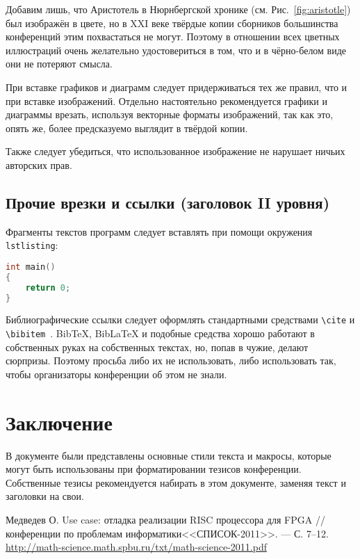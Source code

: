 \documentclass{math-mech-sci}
\begin{document}
Добавим лишь, что Аристотель в Нюрнбергской хронике
(см. Рис.~\ref{fig:aristotle}) был изображён в цвете, но в XXI веке
твёрдые копии сборников большинства конференций этим похвастаться не
могут. Поэтому в отношении всех цветных иллюстраций очень желательно
удостовериться в том, что и в чёрно-белом виде они не потеряют смысла.

При вставке графиков и диаграмм следует придерживаться тех же правил,
что и при вставке изображений. Отдельно настоятельно рекомендуется
графики и диаграммы врезать, используя векторные форматы изображений,
так как это, опять же, более предсказуемо выглядит в твёрдой копии.

Также следует убедиться, что использованное изображение не нарушает
ничьих авторских прав.

\subsection*{Прочие врезки и ссылки (заголовок II уровня)}

Фрагменты текстов программ следует вставлять при помощи окружения
\texttt{lstlisting}:

\begin{lstlisting}[language=C,label=lst:code1]
int main()
{
    return 0;
}
\end{lstlisting}

Библиографические ссылки следует оформлять стандартными средствами
\texttt{\textbackslash{}cite} и
\texttt{\textbackslash{}bibitem}~\cite{medvedev2011}. BibTeX, BibLaTeX
и подобные средства хорошо работают в собственных руках на собственных
текстах, но, попав в чужие, делают сюрпризы.  Поэтому просьба либо их
не использовать, либо использовать так, чтобы организаторы конференции
об этом не знали.

\section*{Заключение}

В документе были представлены основные стили текста и макросы, которые
могут быть использованы при форматировании тезисов конференции.
Собственные тезисы рекомендуется набирать в этом документе, заменяя
текст и заголовки на свои.

\begin{thebibliography}{8}

     Медведев О. Use case: отладка реализации RISC
    процессора для FPGA // %
    конференции по проблемам информатики<<СПИСОК-2011>>. --- %
    С. 7--12.
    \href{http://math-science.math.spbu.ru/txt/math-science-2011.pdf}{http://math-science.math.spbu.ru/txt/math-science-2011.pdf}

\end{thebibliography}
\end{document}
